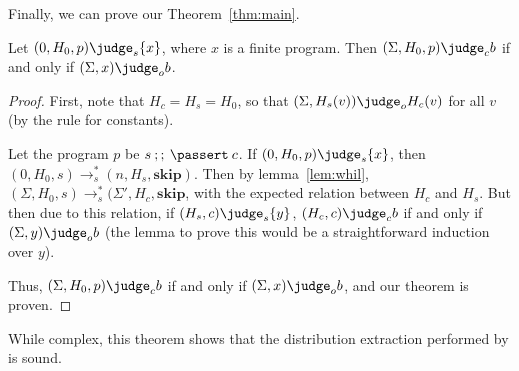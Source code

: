 Finally, we can prove our Theorem~\ref{thm:main}.

\begin{theorem}
Let $(0, H_0, p) \judge_s \{ x \}$, where $x$ is a finite program.
Then $(\Sigma, H_0, p) \judge_c b$ if and only if $(\Sigma, x) \judge_o b$.
\end{theorem}

\begin{proof}
  First, note that $H_c = H_s = H_0$, so that
  $(\Sigma, H_s(v)) \judge_o H_c(v)$ for all $v$
  (by the rule for constants).

  Let the program $p$ be $s\:;;\:\passert\:c$.
  If $(0, H_0, p) \judge_s \{ x \}$, then
  $(0, H_0, s) \to_s^{*} (n, H_s, \mathbf{skip})$.
  Then by lemma~\ref{lem:whil},
  $(\Sigma, H_0, s) \to_s^{*} (\Sigma', H_c, \mathbf{skip}$,
  with the expected relation between $H_c$ and $H_s$.
  But then due to this relation,
  if $(H_s, c) \judge_s \{ y \}$,
  $(H_c, c) \judge_c b$ if and only if $(\Sigma, y) \judge_o b$
  (the lemma to prove this would be a straightforward induction over $y$).

  Thus, $(\Sigma, H_0, p) \judge_c b$ if
  and only if $(\Sigma, x) \judge_o b$,
  and our theorem is proven.
\end{proof}

While complex, this theorem shows that the distribution extraction
performed by \tool is sound.
